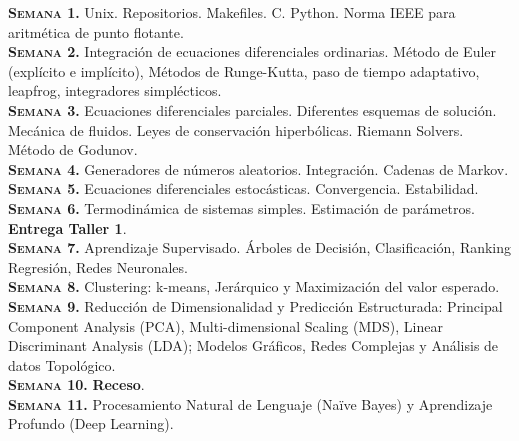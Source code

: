 \documentclass[letterpaper,10pt,onecolumn]{article}
\begin{document}
\noindent\normalsize\textbf{\textsc{Semana 1.}}
Unix. Repositorios. Makefiles. C. Python. Norma IEEE para aritm\'etica de punto
flotante. 
\\[-0.3cm]

\noindent\textbf{\textsc{Semana 2.}} Integraci\'on de ecuaciones
diferenciales ordinarias. M\'etodo de Euler (expl\'icito e
impl\'icito), M\'etodos de Runge-Kutta, paso de tiempo adaptativo,
leapfrog, integradores simpl\'ecticos.
\\[-0.3cm]  

\noindent\textbf{\textsc{Semana 3.}} 
Ecuaciones diferenciales parciales. Diferentes esquemas de
soluci\'on. Mec\'anica de fluidos. Leyes de conservaci\'on
hiperb\'olicas. Riemann Solvers. M\'etodo de Godunov.
\\[-0.3cm]  

\noindent\textbf{\textsc{Semana 4.}} 
Generadores de n\'umeros aleatorios. Integraci\'on. Cadenas de Markov. 
\\[-0.3cm]  

\noindent\textbf{\textsc{Semana 5.}}
Ecuaciones diferenciales estoc\'asticas. Convergencia. Estabilidad.
\\[-0.3cm]

\noindent\textbf{\textsc{Semana 6.}} 
Termodin\'amica de sistemas simples. Estimaci\'on de par\'ametros. 
{\bf Entrega Taller 1}.
\\[-0.3cm]  

\noindent\textbf{\textsc{Semana 7.}} 
Aprendizaje Supervisado. Árboles de Decisión, Clasificación, Ranking
Regresión, Redes Neuronales. 
\\[-0.3cm]  

\noindent\textbf{\textsc{Semana 8.}} 
Clustering: k-means, Jerárquico y Maximización del valor esperado.
\\[-0.3cm] 

\noindent\textbf{\textsc{Semana 9.}} 
Reducción de Dimensionalidad y Predicción Estructurada: Principal
Component Analysis (PCA), Multi-dimensional Scaling (MDS), Linear
Discriminant Analysis (LDA); Modelos Gráficos, Redes Complejas y
Análisis de datos Topológico.   
\\[-0.3cm] 

\noindent\textbf{\textsc{Semana 10.}}  
{\bf Receso}.
\\[-0.3cm] 

\noindent\textbf{\textsc{Semana 11.}}  
Procesamiento Natural de Lenguaje (Naïve Bayes) y Aprendizaje Profundo
(Deep Learning). 
\\[-0.3cm] 
\end{document}
